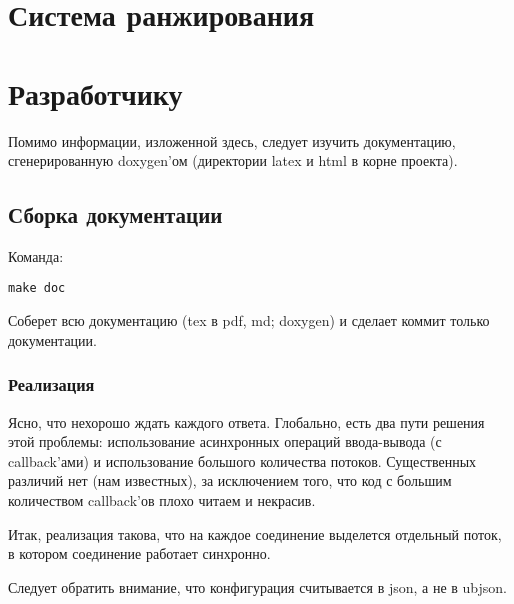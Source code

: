 \documentclass[12pt,a4paper]{article}
\begin{document}
\section{Система ранжирования}
\section{Разработчику}
Помимо информации, изложенной здесь, следует изучить документацию, сгенерированную doxygen'ом (директории latex и html в корне проекта).

\subsection{Сборка документации}
Команда:
\begin{verbatim}
make doc
\end{verbatim}
Соберет всю документацию (tex в pdf, md; doxygen) и сделает коммит только документации.




\subsubsection{Реализация}
Ясно, что нехорошо ждать каждого ответа. 
Глобально, есть два пути решения этой проблемы: использование асинхронных операций ввода-вывода (с callback'ами) и использование большого количества потоков. Существенных различий нет (нам известных), за исключением того, что код с большим количеством callback'ов плохо читаем и некрасив.

Итак, реализация такова, что на каждое соединение выделется отдельный поток, в котором соединение работает синхронно.

Следует обратить внимание, что конфигурация считывается в json, а не в ubjson.
\end{document}
